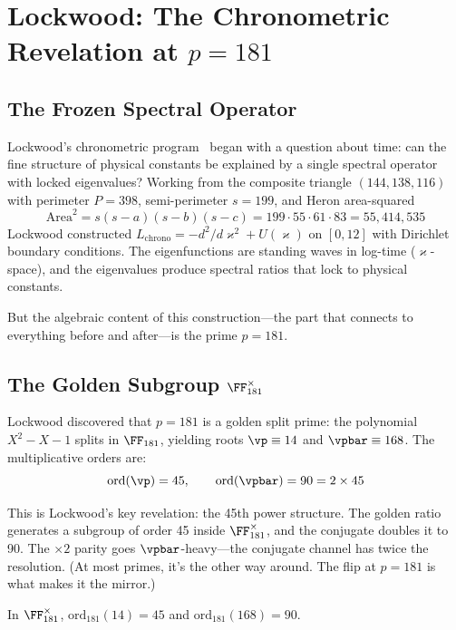 \section{Lockwood: The Chronometric Revelation at $p = 181$}

\subsection{The Frozen Spectral Operator}

Lockwood's chronometric program~\cite{lockwood_chrono3,lockwood_chrono4} began with a question about time: can the fine structure of physical constants be explained by a single spectral operator with locked eigenvalues? Working from the composite triangle $(144, 138, 116)$ with perimeter $P = 398$, semi-perimeter $s = 199$, and Heron area-squared
\[
\mathrm{Area}^2 = s(s-a)(s-b)(s-c) = 199 \cdot 55 \cdot 61 \cdot 83 = 55{,}414{,}535
\]
Lockwood constructed $L_{\mathrm{chrono}} = -d^2/d\varkappa^2 + U(\varkappa)$ on $[0, 12]$ with Dirichlet boundary conditions. The eigenfunctions are standing waves in log-time ($\varkappa$-space), and the eigenvalues produce spectral ratios that lock to physical constants.

But the algebraic content of this construction---the part that connects to everything before and after---is the prime $p = 181$.

\subsection{The Golden Subgroup $\FF_{181}^\times$}

Lockwood discovered that $p = 181$ is a golden split prime: the polynomial $X^2 - X - 1$ splits in $\FF_{181}$, yielding roots $\vp \equiv 14$ and $\vpbar \equiv 168$. The multiplicative orders are:
\begin{equation}\label{eq:lockwood_orders}
\mathrm{ord}(\vp) = 45, \qquad \mathrm{ord}(\vpbar) = 90 = 2 \times 45
\end{equation}

This is Lockwood's key revelation: the 45th power structure. The golden ratio generates a subgroup of order 45 inside $\FF_{181}^\times$, and the conjugate doubles it to 90. The $\times 2$ parity goes $\vpbar$-heavy---the conjugate channel has twice the resolution. (At most primes, it's the other way around. The flip at $p = 181$ is what makes it the mirror.)

\begin{theorem}[Lockwood order theorem at $p = 181$]\label{thm:lockwood_mirror}
In $\FF_{181}^\times$, $\mathrm{ord}_{181}(14) = 45$ and $\mathrm{ord}_{181}(168) = 90$.
\end{theorem}

